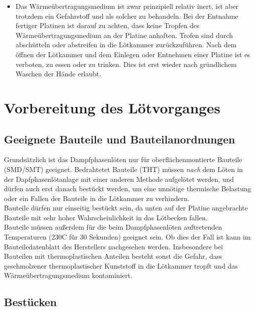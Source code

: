 \documentclass{\basedir/fablab-document}
\begin{document}
\begin{itemize}
	\item Das W{\"a}rme{\"u}bertragungsmedium ist zwar prinzipiell relativ inert, ist aber trotzdem ein Gefahrstoff und als solcher zu behandeln. Bei der Entnahme fertiger Platinen ist darauf zu achten, dass keine Tropfen des W{\"a}rme{\"u}bertragungsmedium an der Platine anhaften. Trofen sind durch absch{\"u}tteln oder abstreifen in die L{\"o}tkammer zur{\"u}ckzuf{\"u}hren. Nach dem {\"o}ffnen der L{\"o}tkammer und dem Einlegen oder Entnehmen einer Platine ist es verboten, zu essen oder zu trinken. Dies ist erst wieder nach gr{\"u}ndlichem Waschen der H{\"a}nde erlaubt. 
	\end{itemize}
	
	\section{Vorbereitung des L{\"o}tvorganges}
	\subsection{Geeignete Bauteile und Bauteilanordnungen}
	
	Grunds{\"a}tzlich ist das Dampfphasenl{\"o}ten nur f{\"u}r oberfl{\"a}chenmontierte Bauteile (SMD/SMT) geeignet. Bedrahtetet Bauteile (THT) m{\"u}ssen \textit{nach} dem L{\"o}ten in der Dapfphasenl{\"o}tanlage mit einer anderen Methode aufgel{\"o}tet werden, und d{\"u}rfen auch erst danach best{\"u}ckt werden, um eine unn{\"o}tige thermische Belastung oder ein Fallen der Bauteile in die L{\"o}tkammer zu verhindern.\\

Bauteile d{\"u}rfen nur einseitig best{\"u}ckt sein, da unten auf der Platine angebrachte Bauteile mit sehr hoher Wahrscheinlichkeit in das L{\"o}tbecken fallen. \\

Bauteile m{\"u}ssen au{\ss}erdem f{\"u}r die beim Dampfphasenl{\"o}ten auftretenden Temperaturen (230\textdegree C f{\"u}r 30 Sekunden) geeignet sein. Ob dies der Fall ist kann im Bauteiledatenblatt des Herstellers nachgesehen werden. Insbesondere bei Bauteilen mit thermoplastischen Anteilen besteht sonst die Gefahr, dass geschmolzener thermoplastischer Kunststoff in die L{\"o}tkammer tropft und das W{\"a}rme{\"u}bertragungsmedium kontaminiert.

\subsection{Best{\"u}cken}
\end{document}
